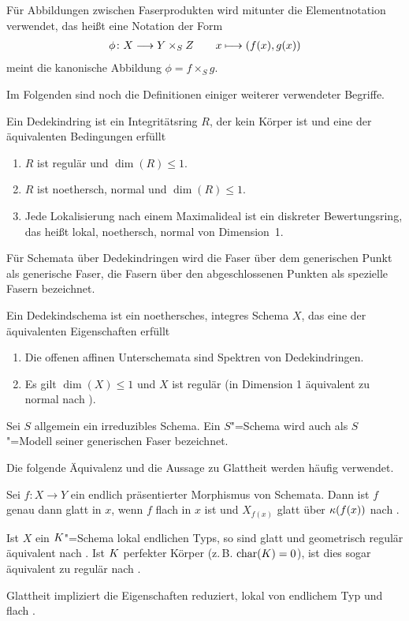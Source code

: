 Für Abbildungen zwischen Faserprodukten wird mitunter die
Elementnotation verwendet, das heißt eine Notation der Form
\begin{gather*}
  \phi\colon X\longto Y\times_S Z\qquad
  x\longmapsto (f(x),g(x))
\end{gather*}
meint die kanonische Abbildung $\phi=f\times_S g$.

Im Folgenden sind noch die Definitionen einiger weiterer verwendeter Begriffe.
\begin{Definition}[Dedekindring]\label{def:dedekindring}
  Ein Dedekindring ist ein Integritätsring $R$, der kein Körper ist
  und eine der äquivalenten Bedingungen erfüllt
  \begin{enumerate}[label=(\roman*)]
  \item $R$ ist regulär und $\dim(R)\leq 1$.
  \item $R$ ist noethersch, normal und $\dim(R)\leq 1$.
  \item Jede Lokalisierung nach einem Maximalideal ist ein diskreter
    Bewertungsring,
    das heißt lokal, noethersch, normal von Dimension~1.
  \end{enumerate}
\end{Definition}
Für Schemata über Dedekindringen wird die Faser über dem
generischen Punkt als generische Faser, die Fasern über den
abgeschlossenen Punkten als spezielle Fasern bezeichnet.
\begin{Definition}[Dedekindschema]
  Ein Dedekindschema ist ein noethersches, integres Schema $X$, das
  eine der äquivalenten Eigenschaften erfüllt
  \begin{enumerate}[label=(\roman*)]
  \item Die offenen affinen Unterschemata sind Spektren von Dedekindringen.
  \item Es gilt $\dim(X)\leq 1$ und $X$ ist regulär
    (in Dimension 1 äquivalent zu normal nach
    \cite[Corollary~6.39, Proposition~6.40]{wedhorn}).
  \end{enumerate}
\end{Definition}
Sei $S$ allgemein ein irreduzibles Schema. Ein $S$"=Schema wird auch als
$S$"=Modell seiner generischen Faser bezeichnet.

Die folgende Äquivalenz und die Aussage zu Glattheit werden häufig
verwendet.
\begin{Bemerkung}\label{thm:eigglatt}
  Sei $f\colon X\to Y$ ein endlich präsentierter Morphismus von Schemata.
  Dann ist $f$ genau dann glatt in $x$, wenn $f$ flach in $x$ ist und
  $X_{f(x)}$ glatt über $\kappa(f(x))$ nach
  \cite[Proposition~8.5/17]{bosch}.
  
  Ist $X$ ein $K$"=Schema lokal endlichen Typs, so sind glatt und
  geometrisch regulär äquivalent nach \cite[Corollary~6.32]{wedhorn}.
  Ist $K$ perfekter Körper (z.\,B. $\operatorname{char}(K)=0$), ist dies sogar
  äquivalent zu regulär nach \cite[Remark~6.33]{wedhorn}.
    
  Glattheit impliziert die Eigenschaften reduziert, lokal von
  endlichem Typ und flach
  \cite[für flach siehe][Theorem~14.22]{wedhorn}.
\end{Bemerkung}

